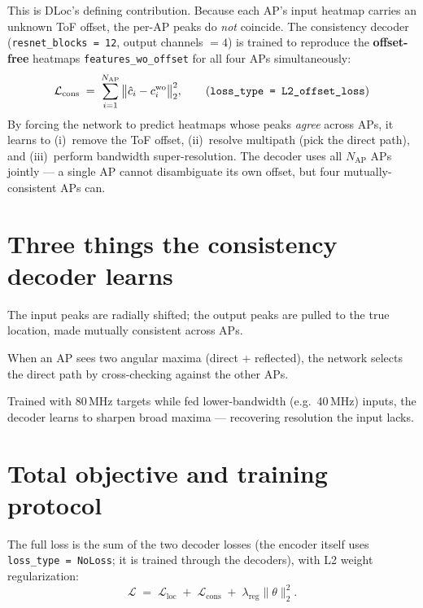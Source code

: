 \documentclass[11pt,a4paper]{article}
\begin{document}
This is DLoc's defining contribution. Because each AP's input heatmap carries an unknown ToF
offset, the per-AP peaks do \emph{not} coincide. The consistency decoder
(\texttt{resnet\_blocks = 12}, output channels $=4$) is trained to reproduce the
\textbf{offset-free} heatmaps \texttt{features\_wo\_offset} for all four APs simultaneously:
\begin{equation}
\mathcal{L}_{\text{cons}} \;=\; \sum_{i=1}^{N_{\text{AP}}}
\big\lVert \hat{c}_i - c_i^{\text{wo}} \big\rVert_2^2,
\qquad \text{(\texttt{loss\_type = L2\_offset\_loss})}
\end{equation}
By forcing the network to predict heatmaps whose peaks \emph{agree} across APs, it learns to
(i)~remove the ToF offset, (ii)~resolve multipath (pick the direct path), and (iii)~perform
bandwidth super-resolution. The decoder uses all $N_{\text{AP}}$ APs jointly --- a single AP
cannot disambiguate its own offset, but four mutually-consistent APs can.

\section{Three things the consistency decoder learns}

\begin{description}[nosep,leftmargin=1.4cm,style=nextline]
  \item[Offset removal] The input peaks are radially shifted; the output peaks are pulled to the
  true location, made mutually consistent across APs.
  \item[Multipath resolution] When an AP sees two angular maxima (direct + reflected), the
  network selects the direct path by cross-checking against the other APs.
  \item[Super-resolution] Trained with 80\,MHz targets while fed lower-bandwidth (e.g.\ 40\,MHz)
  inputs, the decoder learns to sharpen broad maxima --- recovering resolution the input lacks.
\end{description}

\section{Total objective and training protocol}

The full loss is the sum of the two decoder losses (the encoder itself uses
\texttt{loss\_type = NoLoss}; it is trained through the decoders), with L2 weight regularization:
\begin{equation}
\mathcal{L} \;=\; \mathcal{L}_{\text{loc}} \;+\; \mathcal{L}_{\text{cons}}
\;+\; \lambda_{\text{reg}}\lVert \theta\rVert_2^2 .
\end{equation}
\end{document}

